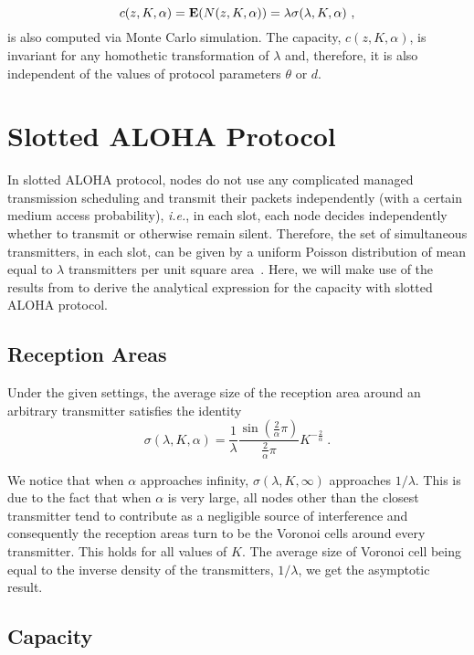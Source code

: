 \documentclass[12pt,english]{article}
\begin{document}
$$
c(z,K,\alpha)={\bf E}(N(z,K,\alpha))=\lambda \sigma(\lambda,K,\alpha)~,
$$ 
is also computed via Monte Carlo simulation. The capacity, $c(z,K,\alpha)$, is invariant for any homothetic transformation of $\lambda$ and, therefore, it is also independent of the values of protocol parameters $\theta$ or $d$.

\section{Slotted ALOHA Protocol}
\label{sec:aloha}

In slotted ALOHA protocol, nodes do not use any complicated managed transmission scheduling and transmit their packets independently (with a certain medium access probability), {\it i.e.}, in each slot, each node decides independently whether to transmit or otherwise remain silent. Therefore, the set of simultaneous transmitters, in each slot, can be given by a uniform Poisson distribution of mean equal to $\lambda$ transmitters per unit square area~\cite{Jacquet:2009,SR-ALOHA,Weber2}. Here, we will make use of the results from \cite{Jacquet:2009} to derive the analytical expression for the capacity with slotted ALOHA protocol.

\subsection{Reception Areas}

Under the given settings, the average size of the reception area around an arbitrary transmitter satisfies the identity
\begin{equation}
\sigma(\lambda,K,\alpha)=\frac{1}{\lambda}\frac{\sin(\frac{2}{\alpha}\pi)}{\frac{2}{\alpha}\pi}K^{-\frac{2}{\alpha}}~.
\label{eq:poisson_area}
\end{equation}

We notice that when $\alpha$ approaches infinity, $\sigma(\lambda,K,\infty)$ approaches $1/\lambda$. This is due to the fact that when $\alpha$ is very large, all nodes other than the closest transmitter tend to contribute as a negligible source of interference and consequently the reception areas turn to be the Voronoi cells around every transmitter. This holds for all values of $K$. The average size of Voronoi cell being equal to the inverse density of the transmitters,
$1/\lambda$, we get the asymptotic result. 

\subsection{Capacity}
\end{document}
